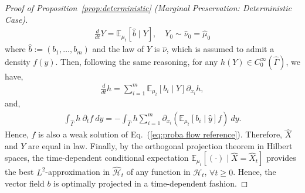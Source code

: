 \documentclass[11pt, a4paper, oneside, reqno]{amsart}
\begin{document}
\begin{proof}[Proof of Proposition~\ref{prop:deterministic} (Marginal Preservation: Deterministic Case)]
\begin{eqnarray}
        \frac{d}{dt}Y=\mathbb{E}_{\mu_t}[\hat{b}\mid  Y], \quad Y_0\sim \hat{\nu}_0 = \hat{\mu}_0
    \end{eqnarray}
    where $\hat{b}:=(b_1,\dots,b_m)$ and the law of $Y$ is $\hat{\nu}$, which is assumed to admit a density $f(y)$. Then, following the same reasoning, for any $h(Y)\in C_0^\infty(\hat{\Gamma})$, we have,
    \begin{eqnarray}
        \frac{d}{dt}h = \sum_{i=1}^m \mathbb{E}_{\mu_t}[b_i\mid Y]\partial_{x_i}h,
    \end{eqnarray}
    and,
    \begin{eqnarray}
         \int_{\hat{\Gamma}} h \ \partial_tf \ dy = -\int_{\hat{\Gamma}} h \sum_{i=1}^m\partial_{x_i}(\mathbb{E}_{\mu_t}[b_i\mid \hat{y}] f)\ dy.
    \end{eqnarray}
    Hence, $f$ is also a weak solution of Eq.~(\ref{eq:proba flow reference}).
    Therefore, $\hat{X}$ and $Y$ are equal in law.
    Finally, by the orthogonal projection theorem in Hilbert spaces, the time-dependent conditional expectation $\mathbb{E}_{\mu_t}[(\cdot)\mid\hat{X}=\hat{X}_t]$ provides the best $L^2$-approximation in $\hat{\mathcal{H}}_t$ of any function in $\mathcal{H}_t$, $\forall t \geq 0$. Hence, the vector field $b$ is optimally projected in a time-dependent fashion.
\end{proof}
\end{document}
